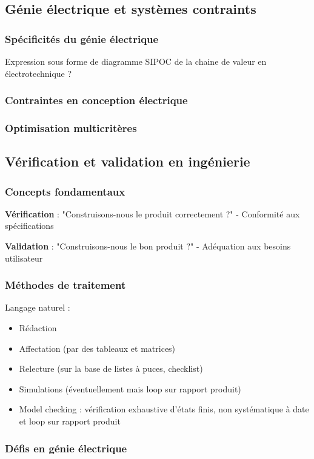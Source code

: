 \documentclass[a4paper,12pt]{article}
\begin{document}
\subsection{Génie électrique et systèmes contraints}
\label{sec:orgd0a9508}
\subsubsection{Spécificités du génie électrique}
\label{sec:org137e646}
Expression sous forme de diagramme SIPOC de la chaine de valeur en électrotechnique ?
\subsubsection{Contraintes en conception électrique}
\label{sec:org7bd0aa6}
\subsubsection{Optimisation multicritères}
\label{sec:orgadc64bb}
\subsection{Vérification et validation en ingénierie}
\label{sec:org0ad4e57}
\subsubsection{Concepts fondamentaux}
\label{sec:orgd90b04d}
\textbf{Vérification} : "Construisons-nous le produit correctement ?" - Conformité aux spécifications

\textbf{Validation} : "Construisons-nous le bon produit ?" - Adéquation aux besoins utilisateur
\subsubsection{Méthodes de traitement}
\label{sec:org664d34b}
Langage naturel :
\begin{itemize}
\item Rédaction
\item Affectation (par des tableaux et matrices)
\item Relecture (sur la base de listes à puces, checklist)
\item Simulations (éventuellement mais loop sur rapport produit)
\item Model checking : vérification exhaustive d'états finis, non systématique à date et loop sur rapport produit
\end{itemize}
\subsubsection{Défis en génie électrique}
\label{sec:org07423c6}
\end{document}

